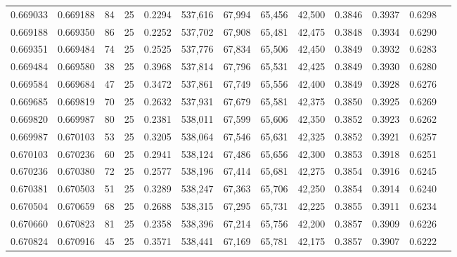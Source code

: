 \begin{tabular}{rrrrrrrrrrrrr}
0.669033 & 0.669188 &    84 &  25 &                                     0.2294 & 537,616 &  67,994 &  65,456 &  42,500 & 0.3846 & 0.3937 & 0.6298 \\
0.669188 & 0.669350 &    86 &  25 &                                     0.2252 & 537,702 &  67,908 &  65,481 &  42,475 & 0.3848 & 0.3934 & 0.6290 \\
0.669351 & 0.669484 &    74 &  25 &                                     0.2525 & 537,776 &  67,834 &  65,506 &  42,450 & 0.3849 & 0.3932 & 0.6283 \\
0.669484 & 0.669580 &    38 &  25 &                                     0.3968 & 537,814 &  67,796 &  65,531 &  42,425 & 0.3849 & 0.3930 & 0.6280 \\
0.669584 & 0.669684 &    47 &  25 &                                     0.3472 & 537,861 &  67,749 &  65,556 &  42,400 & 0.3849 & 0.3928 & 0.6276 \\
0.669685 & 0.669819 &    70 &  25 &                                     0.2632 & 537,931 &  67,679 &  65,581 &  42,375 & 0.3850 & 0.3925 & 0.6269 \\
0.669820 & 0.669987 &    80 &  25 &                                     0.2381 & 538,011 &  67,599 &  65,606 &  42,350 & 0.3852 & 0.3923 & 0.6262 \\
0.669987 & 0.670103 &    53 &  25 &                                     0.3205 & 538,064 &  67,546 &  65,631 &  42,325 & 0.3852 & 0.3921 & 0.6257 \\
0.670103 & 0.670236 &    60 &  25 &                                     0.2941 & 538,124 &  67,486 &  65,656 &  42,300 & 0.3853 & 0.3918 & 0.6251 \\
0.670236 & 0.670380 &    72 &  25 &                                     0.2577 & 538,196 &  67,414 &  65,681 &  42,275 & 0.3854 & 0.3916 & 0.6245 \\
0.670381 & 0.670503 &    51 &  25 &                                     0.3289 & 538,247 &  67,363 &  65,706 &  42,250 & 0.3854 & 0.3914 & 0.6240 \\
0.670504 & 0.670659 &    68 &  25 &                                     0.2688 & 538,315 &  67,295 &  65,731 &  42,225 & 0.3855 & 0.3911 & 0.6234 \\
0.670660 & 0.670823 &    81 &  25 &                                     0.2358 & 538,396 &  67,214 &  65,756 &  42,200 & 0.3857 & 0.3909 & 0.6226 \\
0.670824 & 0.670916 &    45 &  25 &                                     0.3571 & 538,441 &  67,169 &  65,781 &  42,175 & 0.3857 & 0.3907 & 0.6222 \\

\end{tabular}
